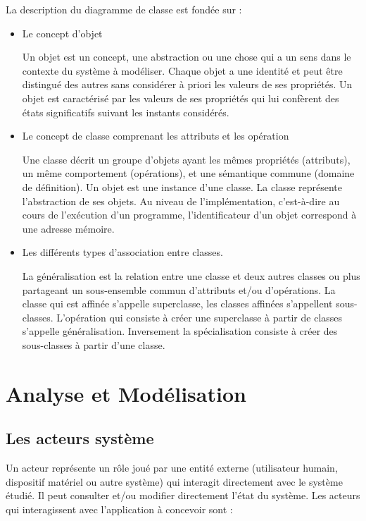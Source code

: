 La description du diagramme de classe est fondée sur :

\begin{itemize}[label=\textbullet, font=\LARGE \color{blue}] 
	\item  Le concept d'objet
	
	Un objet est un concept, une abstraction ou une chose qui a un sens dans le contexte du système à modéliser. Chaque objet a une identité et peut être distingué des autres sans considérer à priori les valeurs de ses propriétés.
Un objet est caractérisé par les valeurs de ses propriétés qui lui confèrent des états significatifs suivant les instants considérés.

	\item  Le concept de classe comprenant les attributs et les opération
	
	Une classe décrit un groupe d’objets ayant les mêmes propriétés (attributs), un même comportement (opérations), et une sémantique commune (domaine de définition). Un objet est une instance d’une classe. La classe représente l’abstraction de ses objets. Au niveau de l’implémentation, c’est-à-dire au cours de l’exécution d’un programme, l’identificateur d’un objet correspond à une adresse mémoire.
	
	\item  Les différents types d'association entre classes.
	
	La généralisation est la relation entre une classe et deux autres classes ou plus partageant un sous-ensemble commun d’attributs et/ou d’opérations.
La classe qui est affinée s’appelle superclasse, les classes affinées s’appellent sous-classes. L’opération qui consiste à créer une superclasse à partir de classes s’appelle généralisation. Inversement la spécialisation consiste à créer des sous-classes à partir d’une classe.

\end{itemize}

\section{Analyse et Modélisation}

\subsection{Les acteurs système}

Un acteur représente un rôle joué par une entité externe (utilisateur humain, dispositif matériel ou autre système) qui interagit directement avec le système étudié. Il peut consulter et/ou modifier directement l’état du système. Les acteurs qui interagissent avec l’application à concevoir sont :

